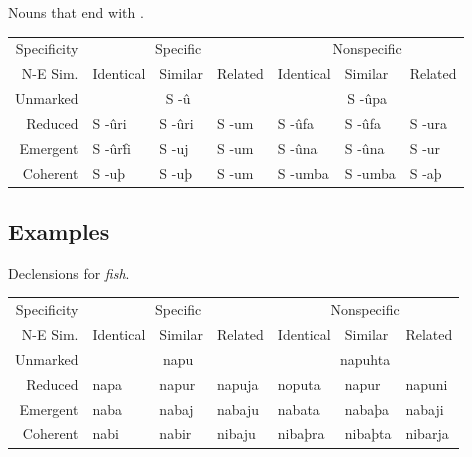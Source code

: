 \documentclass{book}
\begin{document}
\begin{tablenf}
  \caption{Nouns that end with . \label{table:declensionlast}}
  \centering
  \begin{tabular}{r|lll|lll}
    Specificity & \multicolumn{3}{c|}{Specific} & \multicolumn{3}{c}{Nonspecific} \\
    N-E \bs{} Sim. & Identical & Similar & Related & Identical & Similar & Related \\
    \hline
    Unmarked & \multicolumn{3}{c|}{S -û} & \multicolumn{3}{c}{S -ûpa} \\
    Reduced & S -ûri & S -ûri & S -um & S -ûfa & S -ûfa & S -ura \\
    Emergent & S -ûrḟi & S -uj & S -um & S -ûna & S -ûna & S -ur \\
    Coherent & S -uþ & S -uþ & S -um & S -umba & S -umba & S -aþ \\
  \end{tabular}
\end{tablenf}

\subsection{Examples}

\begin{tablenf}
  \caption{Declensions for  \emph{fish}. \label{table:declensionex1}}
  \centering
  \begin{tabular}{r|lll|lll}
    Specificity & \multicolumn{3}{c|}{Specific} & \multicolumn{3}{c}{Nonspecific} \\
    N-E \bs{} Sim. & Identical & Similar & Related & Identical & Similar & Related \\
    \hline
    Unmarked & \multicolumn{3}{c|}{napu} & \multicolumn{3}{c}{napuhta} \\
    Reduced & napa & napur & napuja & noputa & napur & napuni \\
    Emergent & naba & nabaj & nabaju & nabata & nabaþa & nabaji \\
    Coherent & nabi & nabir & nibaju & nibaþra & nibaþta &nibarja \\
  \end{tabular}
\end{tablenf}
\end{document}
